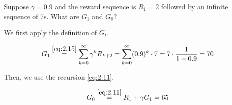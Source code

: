 
\begin{exercise}[Exercise 3.9]

Suppose $\gamma = 0.9$ and the reward sequence is $R_1 = 2$ followed by an infinite sequence of $7$s.
What are $G_1$ and $G_0$?    

\end{exercise}


\begin{solution}

We first apply the definition of $G_t$.

\begin{align*}
    G_1
    \stackrel
    {
        \eqref{eq:2.15}
    }{=}
    \sum_{k=0}^\infty
        \gamma^k R_{k+2}
    =
    \sum_{k=0}^\infty
        (0.9)^k \cdot 7
    =
    7 \cdot \frac{1}{1 - 0.9}
    =
    70
\end{align*}

Then, we use the recursion \eqref{eq:2.11}.

\begin{align*}
    G_0
    \stackrel
    {
        \eqref{eq:2.11}
    }{=}
    R_1 + \gamma G_1 = 65
\end{align*}

\end{solution}

